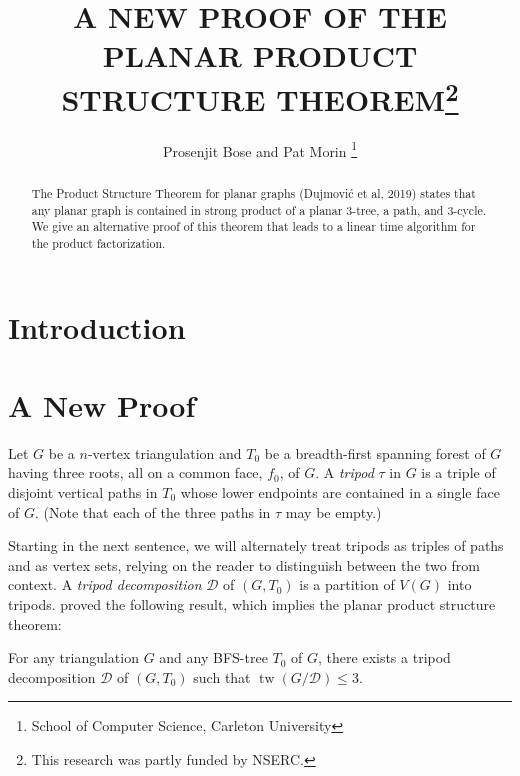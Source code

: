 \documentclass{patmorin}
\title{\MakeUppercase{A New Proof of the Planar Product Structure Theorem}\thanks{This research was partly funded by NSERC.}}
\author{Prosenjit Bose and Pat Morin%
    \thanks{School of Computer Science, Carleton University}}
\date{}
\DeclareMathOperator{\tw}{tw}
\begin{document}
\maketitle

\begin{abstract}
    The Product Structure Theorem for planar graphs (Dujmović et al, 2019) states that any planar graph is contained in strong product of a planar $3$-tree, a path, and $3$-cycle.  We give an alternative proof of this theorem that leads to a linear time algorithm for the product factorization.
\end{abstract}

%

\section{Introduction}

\section{A New Proof}


Let $G$ be a $n$-vertex triangulation and $T_0$ be a breadth-first spanning forest of $G$ having three roots, all on a common face, $f_0$, of $G$.  A \emph{tripod} $\tau$ in $G$ is a triple of disjoint vertical paths in $T_0$ whose lower endpoints are contained in a single face of $G$.  (Note that each of the three paths in $\tau$ may be empty.)

Starting in the next sentence, we will alternately treat tripods as triples of paths and as vertex sets, relying on the reader to distinguish between the two from context.  A \emph{tripod decomposition} $\mathcal{D}$ of $(G,T_0)$ is a partition of $V(G)$ into tripods.  \citet{dujmovic.joret.ea:planar} proved the following result, which implies the planar product structure theorem:

\begin{thm}\label{tripod_decomposition}
  For any triangulation $G$ and any BFS-tree $T_0$ of $G$, there exists a tripod decomposition $\mathcal{D}$ of $(G,T_0)$ such that $\tw(G/\mathcal{D})\le 3$.
\end{thm}
\end{document}
